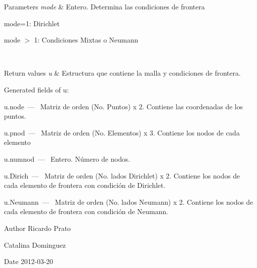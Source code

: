 \begin{DoxyParams}{Parameters}
{\em mode} & Entero. Determina las condiciones de frontera
\begin{DoxyItemize}
\item mode=1\-: Dirichlet
\item mode $>$ 1\-: Condiciones Mixtas o Neumann
\end{DoxyItemize}\\
\hline
\end{DoxyParams}

\begin{DoxyRetVals}{Return values}
{\em u} & Estructura que contiene la malla y condiciones de frontera.\\
\hline
\end{DoxyRetVals}
\begin{DoxyParagraph}{Generated fields of u\-:}
\begin{DoxyItemize}
\item {\ttfamily u.\-node~---~} Matriz de orden (No. Puntos) x 2. Contiene las coordenadas de los puntos. \item {\ttfamily u.\-pnod~---~} Matriz de orden (No. Elementos) x 3. Contiene los nodos de cada elemento \item {\ttfamily u.\-numnod~---~} Entero. Número de nodos. \item {\ttfamily u.\-Dirich~---~} Matriz de orden (No. lados Dirichlet) x 2. Contiene los nodos de cada elemento de frontera con condición de Dirichlet. \item {\ttfamily u.\-Neumann~---~} Matriz de orden (No. lados Neumann) x 2. Contiene los nodos de cada elemento de frontera con condición de Neumann. \end{DoxyItemize}

\end{DoxyParagraph}
\begin{DoxyAuthor}{Author}
Ricardo Prato 

Catalina Dominguez 
\end{DoxyAuthor}
\begin{DoxyDate}{Date}
2012-\/03-\/20 
\end{DoxyDate}
